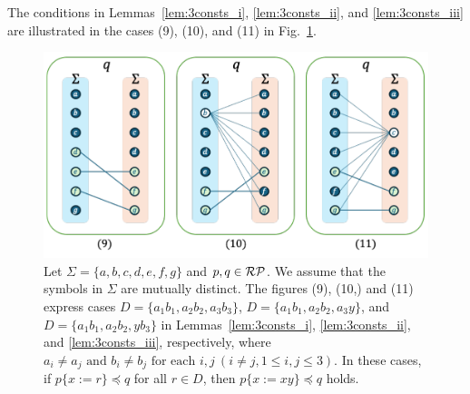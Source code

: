 The conditions in Lemmas~\ref{lem:3consts_i}, \ref{lem:3consts_ii}, and \ref{lem:3consts_iii} are illustrated in the cases (9), (10), and (11) in Fig.~\ref{fig:lem7bigraph}.

\begin{figure}[t]
  \begin{center}
    \includegraphics[scale=0.525]{figs/lem7bigraph.pdf}
    \caption{Let $\Sigma=\{a,b,c,d,e,f,g\}$ and $p,q \in \mathcal{RP}$. We assume that the symbols in $\Sigma$ are mutually distinct.
    The figures (9), (10,) and (11) express cases $D = \{ a_{1}b_{1}, a_{2}b_{2}, a_{3}b_{3} \}$, $D = \{ a_{1}b_{1}, a_{2}b_{2}, a_{3}y \}$, and $D = \{a_{1}b_{1}, a_{2}b_{2}, yb_{3}\}$ in Lemmas~\ref{lem:3consts_i}, \ref{lem:3consts_ii}, and \ref{lem:3consts_iii}, respectively, where $a_{i} \ne a_{j} \mbox{ and } b_{i} \ne b_{j} \mbox{ for each } i,j~(i\ne j, 1\le i,j\le 3)$.
    In these cases, if $p \{ x := r \} \preceq q$ for all $r \in D$, then $p \{ x := xy \} \preceq q$ holds.}\label{fig:lem7bigraph}
  \end{center}
\end{figure}


